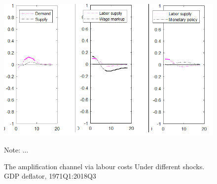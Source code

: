 \documentclass[11pt]{article}
\begin{document}
\begin{figure}[!h]
\begin{center}
\caption{The amplification channel via labour costs Under different shocks. GDP deflator, 1971Q1:2018Q3}\label{fig:EA_counter}
\includegraphics[scale = .8]{EA_5shockVAR_Counter.png}
\begin{minipage}{\textwidth} {\footnotesize
Note: ...\par}
\end{minipage}
\end{center}
\end{figure}
\end{document}
